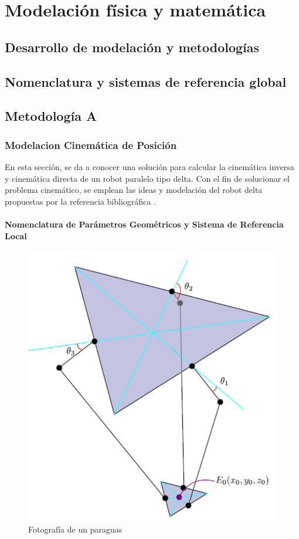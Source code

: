 \chapter{Modelación física y matemática}\label{CAP4}
    
\section{Desarrollo de modelación y metodologías}

\section{Nomenclatura y sistemas de referencia global}
     \newpage

\section{Metodología A}

    \subsection{Modelacion Cinemática de Posición}
    
        En esta sección, se da a conocer una solución para calcular la cinemática inversa y cinemática directa de un robot paralelo tipo delta. Con el fin de solucionar el problema cinemático, se emplean las ideas y modelación del robot delta propuestas por la referencia bibliográfica \cite{Diseno_e_implementacion_de_un_sistema_de_control_para_la_representacion_grafica_a_partir_de_imagenes}.
        
        \subsubsection{Nomenclatura de Parámetros Geométricos y Sistema de Referencia Local}

        \begin{figure}[htb]
             \centering
             \includegraphics[width=0.5\linewidth]{Main/Chapter4/Images4/Metodo_A_Modelacion_Cinematica_Posicion_1.png}
              \caption{Fotografía de un paraguas}
              \label{f:Cap4_Metodo_A_Modelacion_Cinematica_Posicion_1}
        \end{figure}

